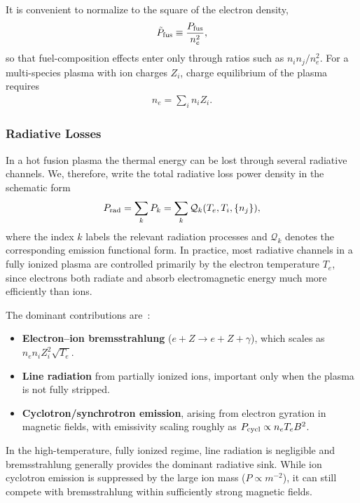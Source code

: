 \documentclass[particles,article,accept,pdftex,moreauthors]{Definitions/mdpi}
\begin{document}
It is convenient to normalize to the square of the electron density,
\begin{align}
\tilde P_{\rm fus}
\equiv \frac{P_{\rm fus}}{n_e^2},
\end{align}
so that fuel-composition effects enter only through ratios such as $n_i n_j/n_e^2$. For a multi-species plasma with ion charges $Z_i$, charge equilibrium of the plasma requires
\begin{align}
n_e = \sum_i n_i Z_i .
\end{align}

\subsubsection{Radiative Losses}\label{sssec:RadLosses}

In a hot fusion plasma the thermal energy can be lost through several radiative channels. We, therefore, write the total radiative loss power density in the schematic form
\begin{align}
P_{\rm rad}
= \sum_k P_k
= \sum_k \mathcal{Q}_k(T_e,T_i,\{n_j\}),
\end{align}
where the index $k$ labels the relevant radiation processes and $\mathcal{Q}_k$ denotes the corresponding emission functional form. In practice, most radiative channels in a fully ionized plasma are controlled primarily by the electron temperature $T_e$, since electrons both radiate and absorb electromagnetic energy much more efficiently than ions.

The dominant contributions are~\cite{Blumenthal:1970gc}:
\begin{itemize}
\item[(a)] \textbf{Electron--ion bremsstrahlung} ($e+Z\rightarrow e+Z+\gamma$), which scales as $n_e n_i Z_i^2 \sqrt{T_e}$.
\item[(b)] \textbf{Line radiation} from partially ionized ions, important only when the plasma is not fully stripped.
\item[(c)] \textbf{Cyclotron/synchrotron emission}, arising from electron gyration in magnetic fields, with emissivity scaling roughly as $P_{\rm cycl}\propto n_e T_e B^2$.
\end{itemize}

In the high-temperature, fully ionized regime, line radiation is negligible and bremsstrahlung generally provides the dominant radiative sink. While ion cyclotron emission is suppressed by the large ion mass ($P\propto m^{-2}$), it can still compete with bremsstrahlung within sufficiently strong magnetic fields.
\end{document}
